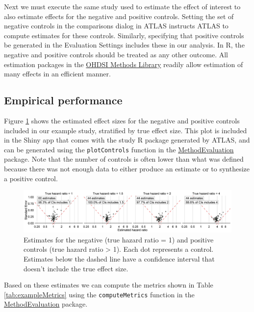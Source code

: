 \documentclass[11pt]{book}
\theoremstyle{definition}
\theoremstyle{definition}
\theoremstyle{definition}
\theoremstyle{remark}
\begin{document}
Next we must execute the same study used to estimate the effect of interest to also estimate effects for the negative and positive controls. Setting the set of negative controls in the comparisons dialog in ATLAS instructs ATLAS to compute estimates for these controls. Similarly, specifying that positive controls be generated in the Evaluation Settings includes these in our analysis. In R, the negative and positive controls should be treated as any other outcome. All estimation packages in the \href{https://ohdsi.github.io/MethodsLibrary/}{OHDSI Methods Library} readily allow estimation of many effects in an efficient manner.

\hypertarget{empirical-performance}{%
\subsection{Empirical performance}\label{empirical-performance}}

Figure \ref{fig:controls} shows the estimated effect sizes for the negative and positive controls included in our example study, stratified by true effect size. This plot is included in the Shiny app that comes with the study R package generated by ATLAS, and can be generated using the \texttt{plotControls} function in the \href{https://ohdsi.github.io/MethodEvaluation/}{MethodEvaluation} package. Note that the number of controls is often lower than what was defined because there was not enough data to either produce an estimate or to synthesize a positive control.

\begin{figure}

{\centering \includegraphics[width=1\linewidth]{images/MethodValidity/controls} 

}

\caption{Estimates for the negative (true hazard ratio = 1) and positive controls (true hazard ratio > 1). Each dot represents a control. Estimates below the dashed line have a confidence interval that doesn't include the true effect size.}\label{fig:controls}
\end{figure}

Based on these estimates we can compute the metrics shown in Table \ref{tab:exampleMetrics} using the \texttt{computeMetrics} function in the \href{https://ohdsi.github.io/MethodEvaluation/}{MethodEvaluation} package.
\end{document}
